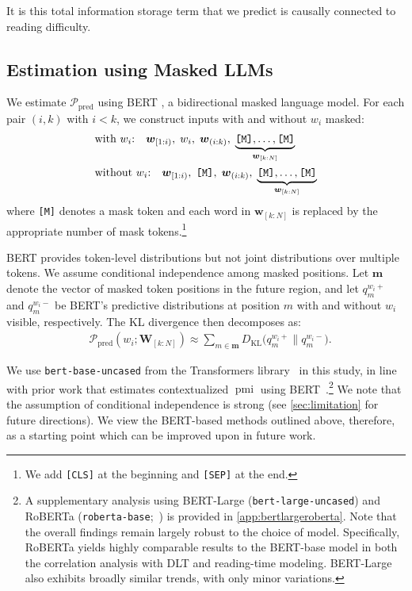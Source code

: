 \documentclass[11pt]{article}
\newcommand{\wseq}[2]{\ensuremath{\boldsymbol w_{[#1: #2]}}\xspace}
\newcommand{\Wseq}[2]{\ensuremath{\boldsymbol W_{[#1: #2]}}\xspace}
\newcommand{\curid}{\ensuremath{k}\xspace}
\newcommand{\sstartid}{\ensuremath{1}\xspace}
\newcommand{\sendid}{\ensuremath{N}\xspace}
\newcommand{\targetid}{\ensuremath{i}\xspace}
\newcommand{\wtarget}{\ensuremath{w_{\targetid}}\xspace}
\newcommand{\future}{\ensuremath{\wseq{\curid}{\sendid}}\xspace}
\newcommand{\Future}{\ensuremath{\Wseq{\curid}{\sendid}}\xspace}
\newcommand{\past}{\ensuremath{\boldsymbol w_{[\sstartid:\targetid)}}\xspace}
\newcommand{\intervenings}{\ensuremath{\boldsymbol w_{(\targetid:\curid)}}\xspace}
\newcommand{\mask}{\texttt{[M]}\xspace}
\newcommand{\pmi}{\ensuremath{\operatorname{pmi}}\xspace}
\newcommand{\CHMI}{\ensuremath{\mathcal{P}_{\mathrm{pred}}}\xspace}
\newcommand{\chmi}[2]{\ensuremath{\CHMI(#1;#2)}\xspace}
\newcommand{\KL}[2]{\ensuremath{D_{\operatorname{KL}}\Big(#1\parallel #2\Big)}\xspace}
\begin{document}
It is this total information storage term that we predict is causally connected to reading difficulty.


\subsection{Estimation using Masked LLMs}
\label{sec:bert}

We estimate \CHMI using BERT \citep{devlin-etal-2019},  a bidirectional masked language model.
For each pair $(\targetid, \curid)$ with $\targetid < \curid$, we construct inputs with and without \wtarget masked:
\begin{align*}
    & \text{with \wtarget:} \quad \past,\; \wtarget,\; \intervenings,\; \underbrace{\mask, \ldots, \mask}_{\future} \\
    & \text{without \wtarget:} \quad \past,\; \mask,\; \intervenings,\; \underbrace{\mask, \ldots, \mask}_{\future}
\end{align*}
where \mask denotes a mask token and each word in \future is replaced by the appropriate number of mask tokens.\footnote{We add \texttt{[CLS]} at the beginning and \texttt{[SEP]} at the end.}

BERT provides token-level distributions but not joint distributions over multiple tokens.
We assume conditional independence among masked positions.
Let $\boldsymbol{m}$ denote the vector of masked token positions in the future region, and let $q^{\wtarget+}_m$ and $q^{\wtarget-}_m$ be BERT's predictive distributions at position $m$ with and without \wtarget visible, respectively.
The KL divergence then decomposes as:
\begin{align}
    & \chmi{\wtarget}{\Future} \approx \sum_{m \in \boldsymbol{m}} \KL{q^{\wtarget+}_m}{q^{\wtarget-}_m}. 
\end{align}

We use \texttt{bert-base-uncased} from the Transformers library~\citep{wolf-etal-2020-transformers} in this study, in line with prior work that estimates contextualized \pmi using BERT~\citep{hoover-etal-2021-linguistic,wilcox2024regressions}.\footnote{A supplementary analysis using BERT-Large (\texttt{bert-large-uncased}) and RoBERTa (\texttt{roberta-base};~\citealp{liu2019roberta}) is provided in \cref{app:bertlargeroberta}.
Note that the overall findings remain largely robust to the choice of model. Specifically, RoBERTa yields highly comparable results to the BERT-base model in both the correlation analysis with DLT and reading-time modeling. BERT-Large also exhibits broadly similar trends, with only minor variations.
}
We note that the assumption of conditional independence is strong (see \cref{sec:limitation} for future directions).
We view the BERT-based methods outlined above, therefore, as a starting point which can be improved upon in future work.
\end{document}
